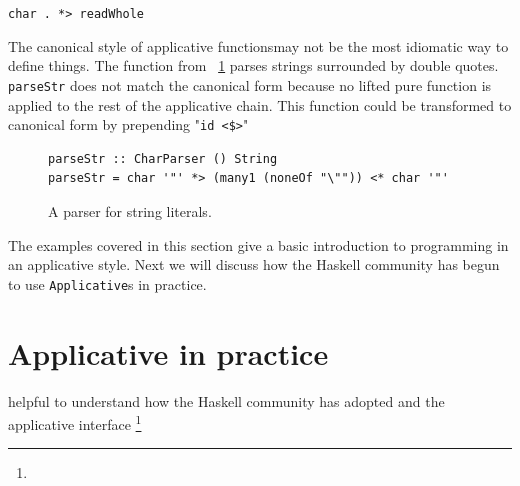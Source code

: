 \begin{center}
	 \DIFaddend \texttt{char \textquotesingle.\textquotesingle~*> readWhole}
\DIFdelbegin {}\DIFdelend \DIFaddbegin \end{center}
 \DIFaddend 

The canonical style of applicative functions\DIFaddbegin {}\DIFaddend may not be the most idiomatic way to define things. The function from \DIFdelbegin {}\DIFdelend \DIFaddbegin {}\DIFaddend ~\ref{strParse} parses strings surrounded by double quotes. \texttt{parseStr} does not match the canonical form because no lifted pure function is applied to the rest of the applicative chain. This function could be transformed to canonical form by prepending "\texttt{id <\$>}\DIFdelbegin {}\DIFdelend "\DIFaddbegin {}\DIFaddend 


\begin{figure}[t]
\begin{lstlisting}
parseStr :: CharParser () String 
parseStr = char '"' *> (many1 (noneOf "\"")) <* char '"'
\end{lstlisting}
\caption{A parser for string literals.}
\label{strParse}
\end{figure}


The examples covered in this section give a basic introduction to programming in an applicative style. Next we will discuss how the Haskell community has begun to use \texttt{Applicative}s in practice. 

\section{Applicative in practice}
\label{sec:appInPractice}

\DIFdelbegin {}\DIFdelend \DIFaddbegin {}\DIFaddend helpful to understand how the Haskell community has adopted and \DIFdelbegin {}\DIFdelend \DIFaddbegin {}\DIFaddend the applicative interface \DIFdelbegin {}\DIFdelend \DIFaddbegin {}\footnote{} 

